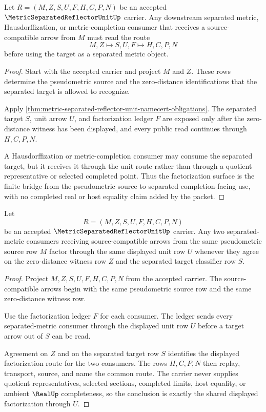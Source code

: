\begin{theorem}
\label{thm:metric-separated-reflector-unit-factorization}
Let $R=(M,Z,S,U,F,H,C,P,N)$ be an accepted $\MetricSeparatedReflectorUnitUp$ carrier. Any downstream separated metric, Hausdorffization, or metric-completion consumer that receives a source-compatible arrow from $M$ must read the route
$$
M,Z \longmapsto S,U,F \longmapsto H,C,P,N
$$
before using the target as a separated metric object.
\end{theorem}
\begin{proof}
Start with the accepted carrier and project $M$ and $Z$. These rows determine the pseudometric source and the zero-distance identifications that the separated target is allowed to recognize.

Apply \autoref{thm:metric-separated-reflector-unit-namecert-obligations}. The separated target $S$, unit arrow $U$, and factorization ledger $F$ are exposed only after the zero-distance witness has been displayed, and every public read continues through $H,C,P,N$.

A Hausdorffization or metric-completion consumer may consume the separated target, but it receives it through the unit route rather than through a quotient representative or selected completed point. Thus the factorization surface is the finite bridge from the pseudometric source to separated completion-facing use, with no completed real or host equality claim added by the packet.
\end{proof}

\begin{theorem}
\label{thm:metric-separated-reflector-unit-universal-factorization}
Let
$$
R=(M,Z,S,U,F,H,C,P,N)
$$
be an accepted $\MetricSeparatedReflectorUnitUp$ carrier. Any two separated-metric consumers receiving source-compatible arrows from the same pseudometric source row $M$ factor through the same displayed unit row $U$ whenever they agree on the zero-distance witness row $Z$ and the separated target classifier row $S$.
\end{theorem}
\begin{proof}
Project $M,Z,S,U,F,H,C,P,N$ from the accepted carrier. The source-compatible arrows begin with the same pseudometric source row and the same zero-distance witness row.

Use the factorization ledger $F$ for each consumer. The ledger sends every separated-metric consumer through the displayed unit row $U$ before a target arrow out of $S$ can be read.

Agreement on $Z$ and on the separated target row $S$ identifies the displayed factorization route for the two consumers. The rows $H,C,P,N$ then replay, transport, source, and name the common route. The carrier never supplies quotient representatives, selected sections, completed limits, host equality, or ambient $\RealUp$ completeness, so the conclusion is exactly the shared displayed factorization through $U$.
\end{proof}

